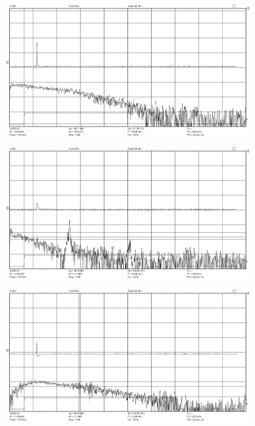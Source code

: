 \documentclass[12pt,a4paper]{article}
\begin{document}
\begin{center}
	\includegraphics[width=.8\linewidth]{data/54_kt3}\hfill
\end{center}	
\begin{center}
	\includegraphics[width=.8\linewidth]{data/54_kt4}\hfill
\end{center}	
\begin{center}
	\includegraphics[width=.8\linewidth]{data/54_kt5}\hfill
\end{center}	

\newpage
\end{document}
